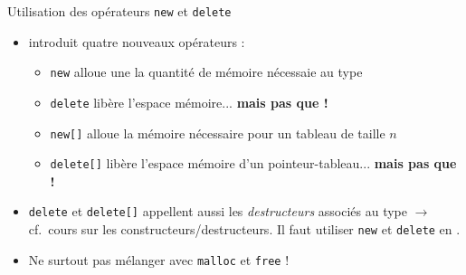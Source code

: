 \documentclass[c]{beamer}
\newcommand{\inline}[1]{\texttt{#1}}
\begin{document}
\begin{frame}[fragile]{Utilisation des opérateurs \texttt{new} et \texttt{delete}}
\begin{itemize}
\item \Cpp introduit quatre nouveaux opérateurs :

\begin{itemize}
\item \inline{new} alloue une la quantité de mémoire nécessaie au type

\item \inline{delete} libère l'espace mémoire... \textbf{mais pas que !}

\item \inline{new[]} alloue la mémoire nécessaire pour un tableau de taille $n$

\item \inline{delete[]} libère l'espace mémoire d'un pointeur-tableau... \textbf{mais pas que !}
\end{itemize}

\item \inline{delete} et \inline{delete[]} appellent aussi les \emph{destructeurs} associés au type $\to$ cf.~cours sur les constructeurs/destructeurs. Il faut utiliser \inline{new} et \inline{delete} en \Cpp.

\item Ne surtout pas mélanger avec \texttt{malloc} et \texttt{free} !
\end{itemize}
\end{frame}


\end{document}
